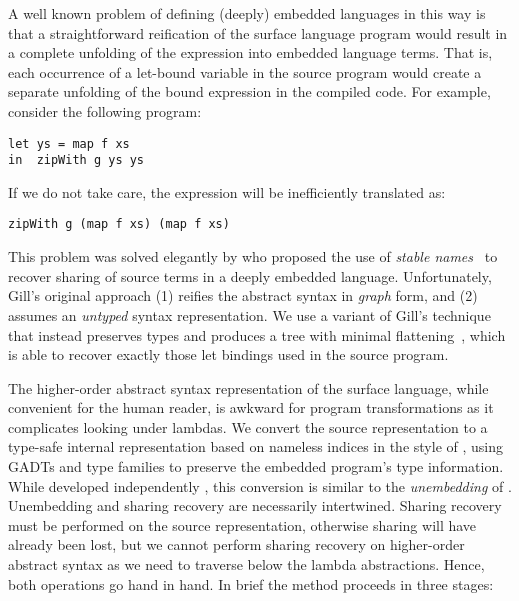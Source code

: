A well known problem of defining (deeply) embedded languages in this way is that
a straightforward reification of the surface language program would result in a
complete unfolding of the expression into embedded language terms. That is, each
occurrence of a let-bound variable in the source program would create a separate
unfolding of the bound expression in the compiled code. For example, consider
the following program:
%
\begin{lstlisting}[style=Haskell]
let ys = map f xs
in  zipWith g ys ys
\end{lstlisting}
%
If we do not take care, the expression will be inefficiently translated as:
%
\begin{lstlisting}[style=Haskell]
zipWith g (map f xs) (map f xs)
\end{lstlisting}

This problem was solved elegantly by \citet{Gill:2009dx} who proposed the use
of \emph{stable names}~\cite{PeytonJones:2000ks} to recover
sharing of source terms in a deeply embedded language. Unfortunately, Gill's
original approach (1) reifies the abstract syntax in \emph{graph} form, and (2)
assumes an \emph{untyped} syntax representation. We use a variant of Gill's
technique that instead preserves types and produces a tree with minimal
flattening~\cite{McDonell:2013wi}, which is able to recover exactly those let
bindings used in the source program.

The higher-order abstract syntax
representation of the surface language, while convenient for the human reader,
is awkward for program transformations as it complicates looking under lambdas.
We convert the source representation to a type-safe internal representation
based on nameless  indices in the style of
\citet{Altenkirch:2003kz}, using GADTs \cite{Jones:2006eh} and type families
\cite{Chakravarty:2005dx,Schrijvers:2008ir} to preserve the embedded program's
type information. While developed independently
\cite{McDonell:2013wi,Chakravarty:2009uo}, this conversion is similar to the
\emph{unembedding} of \citet{Atkey:2009dj}. Unembedding and sharing recovery are
necessarily intertwined. Sharing recovery must be performed on the source
representation, otherwise sharing will have already been lost, but we cannot
perform sharing recovery on higher-order abstract syntax as we need to traverse below the lambda abstractions. Hence,
both operations go hand in hand. In brief the method proceeds in three stages:


